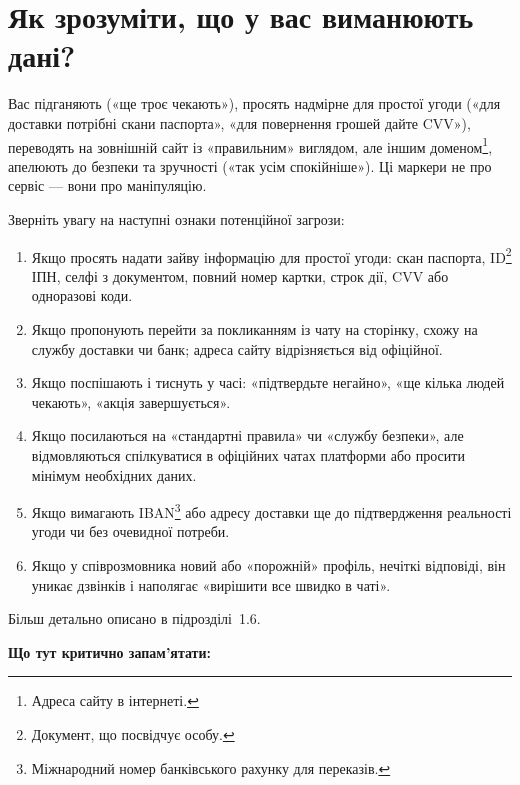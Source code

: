\vspace{0.3cm}
\section{Як зрозуміти, що у вас виманюють дані?}

Вас підганяють («ще троє чекають»), просять надмірне для простої угоди («для доставки потрібні скани паспорта», «для повернення грошей дайте CVV»), переводять на зовнішній сайт із «правильним» виглядом, але іншим доменом\footnote{Адреса сайту в інтернеті.}, апелюють до безпеки та зручності («так усім спокійніше»). Ці маркери не про сервіс — вони про маніпуляцію. 

Зверніть увагу на наступні ознаки потенційної загрози:

\begin{enumerate}
     \item Якщо просять надати зайву інформацію для простої угоди: скан паспорта, ID\footnote{Документ, що посвідчує особу.} ІПН, селфі з документом, повний номер картки, строк дії, CVV або одноразові коди.
     \item Якщо пропонують перейти за покликанням із чату на сторінку, схожу на службу доставки чи банк; адреса сайту відрізняється від офіційної.
    \item Якщо поспішають і тиснуть у часі: «підтвердьте негайно», «ще кілька людей чекають», «акція завершується».
    \item Якщо посилаються на «стандартні правила» чи «службу безпеки», але відмовляються спілкуватися в офіційних чатах платформи або просити мінімум необхідних даних.
    \item Якщо вимагають IBAN\footnote{Міжнародний номер банківського рахунку для переказів.} або адресу доставки ще до підтвердження реальності угоди чи без очевидної потреби.
    \item Якщо у співрозмовника новий або «порожній» профіль, нечіткі відповіді, він уникає дзвінків і наполягає «вирішити все швидко в чаті».
\end{enumerate}

\newpage

\noindent Більш детально описано в підрозділі~1.6.



\vspace{0.3cm}
\noindent\textbf{Що тут критично запам’ятати:}

